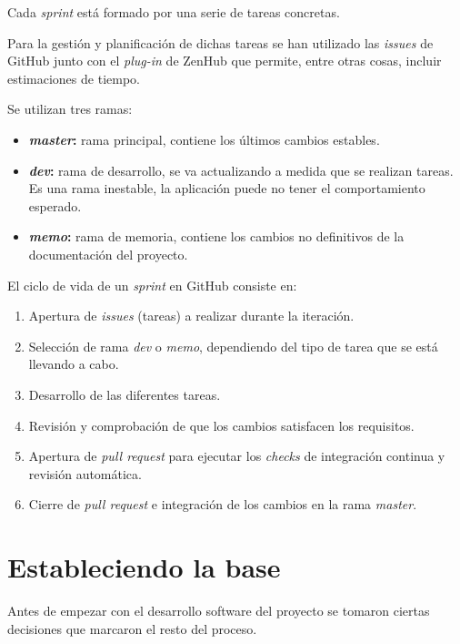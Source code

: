 Cada \emph{sprint} está formado por una serie de tareas concretas.

Para la gestión y planificación de dichas tareas se han utilizado las \emph{issues} de GitHub junto con el \emph{plug-in} de ZenHub que permite, entre otras cosas, incluir estimaciones de tiempo.


Se utilizan tres ramas:

\begin{itemize}
\tightlist
	\item \textbf{\emph{master}:} rama principal, contiene los últimos cambios estables.
	\item \textbf{\emph{dev}:} rama de desarrollo, se va actualizando a medida que se realizan tareas. Es una rama inestable, la aplicación puede no tener el comportamiento esperado.
	\item \textbf{\emph{memo}:} rama de memoria, contiene los cambios no definitivos de la documentación del proyecto.
\end{itemize}


El ciclo de vida de un \emph{sprint} en GitHub consiste en:

\begin{enumerate}
	\item Apertura de \emph{issues} (tareas) a realizar durante la iteración.
	\item Selección de rama \emph{dev} o \emph{memo}, dependiendo del tipo de tarea que se está llevando a cabo.
	\item Desarrollo de las diferentes tareas.
	\item Revisión y comprobación de que los cambios satisfacen los requisitos.
	\item Apertura de \emph{pull request} para ejecutar los \emph{checks} de integración continua y revisión automática.
	\item Cierre de \emph{pull request} e integración de los cambios en la rama \emph{master}.
\end{enumerate}

\section{Estableciendo la base}

Antes de empezar con el desarrollo software del proyecto se tomaron ciertas decisiones que marcaron el resto del proceso.

